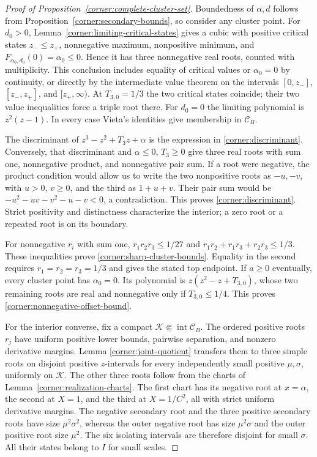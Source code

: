 \begin{proof}[Proof of Proposition~\ref{corner:complete-cluster-set}]
Boundedness of $\alpha,d$ follows from
Proposition~\ref{corner:secondary-bounds}, so consider any cluster point.
For $d_0>0$, Lemma~\ref{corner:limiting-critical-states} gives
a cubic with positive critical states $z_-\leq z_+$,
nonnegative maximum, nonpositive minimum, and
$F_{\alpha_0,d_0}(0)=\alpha_0\leq0$.  Hence it has three
nonnegative real roots, counted with multiplicity.  This conclusion
includes equality of critical values or $\alpha_0=0$ by continuity,
or directly by the intermediate value theorem on the intervals
$[0,z_-]$, $[z_-,z_+]$, and $[z_+,\infty)$.
At $T_{3,0}=1/3$ the two critical states coincide; their two
value inequalities force a triple root there.
For $d_0=0$ the limiting polynomial is $z^2(z-1)$.
In every case Vieta's identities give membership in $\mathcal C_B$.

The discriminant of $z^3-z^2+T_3 z+\alpha$ is the expression
in \eqref{corner:discriminant}.  Conversely, that discriminant and
$\alpha\leq0$, $T_3\geq0$ give three real roots with sum one,
nonnegative product, and nonnegative pair sum.  If a root were
negative, the product condition would allow us to write the two
nonpositive roots as $-u,-v$, with $u>0$, $v\geq0$, and the third
as $1+u+v$.  Their pair sum would be
$-u^2-uv-v^2-u-v<0$, a contradiction.  This proves
\eqref{corner:discriminant}.  Strict positivity and distinctness
characterize the interior; a zero root or a repeated root is on its
boundary.

For nonnegative $r_i$ with sum one,
$r_1r_2r_3\leq1/27$ and
$r_1r_2+r_1r_3+r_2r_3\leq1/3$.
These inequalities prove \eqref{corner:sharp-cluster-bounds}.
Equality in the second requires $r_1=r_2=r_3=1/3$ and gives the
stated top endpoint.  If $a\geq0$ eventually, every cluster point
has $\alpha_0=0$.  Its polynomial is
$z(z^2-z+T_{3,0})$, whose two remaining roots are real and
nonnegative only if $T_{3,0}\leq1/4$.  This proves
\eqref{corner:nonnegative-offset-bound}.

For the interior converse, fix a compact
$\mathcal K\Subset\operatorname{int}\mathcal C_B$. The ordered positive
roots $r_j$ have uniform positive lower bounds, pairwise
separation, and nonzero derivative margins.  Lemma
\ref{corner:joint-quotient} transfers them to three simple roots on
disjoint positive $z$-intervals for every independently small positive
$\mu,\sigma$, uniformly on $\mathcal K$. The other three roots follow from the
charts of Lemma~\ref{corner:realization-charts}.  The first chart has its
negative root at $x=\alpha$, the second at $X=1$, and the third at
$X=1/C^2$, all with strict uniform derivative margins.
The negative secondary root and the three positive secondary roots
have size $\mu^2\sigma^2$, whereas the outer negative root has size
$\mu^2\sigma$ and the outer positive root size $\mu^2$. The six isolating
intervals are therefore disjoint for small $\sigma$.
All their states belong to $I$ for small scales.


\end{proof}
